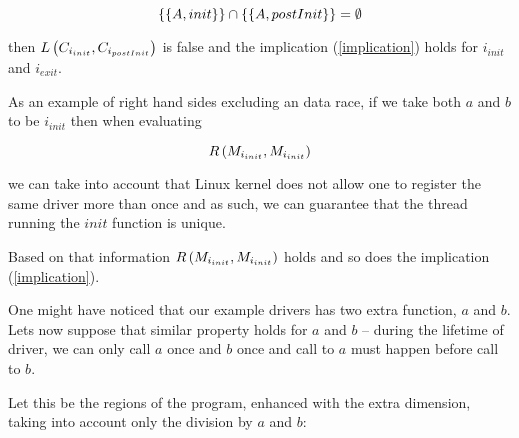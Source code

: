 \documentclass[..thesis.tex]{subfiles}
\begin{document}

\begin{equation*}
 \left\lbrace \left\lbrace A, init \right\rbrace \right\rbrace \cap  \left\lbrace \left\lbrace A, postInit \right\rbrace \right\rbrace = \emptyset
\end{equation*}

then $L \left( C_{i_{init}}, C_{i_{postInit}} \right)$ is false and the implication (\ref{implication}) holds for $i_{init}$ and $i_{exit}$.

As an example of right hand sides excluding an data race, if we take both $a$ and $b$ to be $i_{init}$ then when evaluating 

\begin{equation*}
R \left( M_{i_{init}}, M_{i_{init}} \right)
\end{equation*} 

we can take into account that Linux kernel does not allow one to register the same driver more than once and as such,
we can guarantee that the thread running the $init$ function is unique.

Based on that information $R \left( M_{i_{init}}, M_{i_{init}} \right)$ holds and so does the implication (\ref{implication}).


One might have noticed that our example drivers has two extra function, $a$ and $b$. Lets now suppose that similar property holds for $a$ and $b$ --
during the lifetime of driver, we can only call $a$ once and $b$ once and call to $a$  must happen before call to $b$.

Let this be the regions of the program, enhanced with the extra dimension, taking into account only the division by $a$ and $b$:



\end{document}
